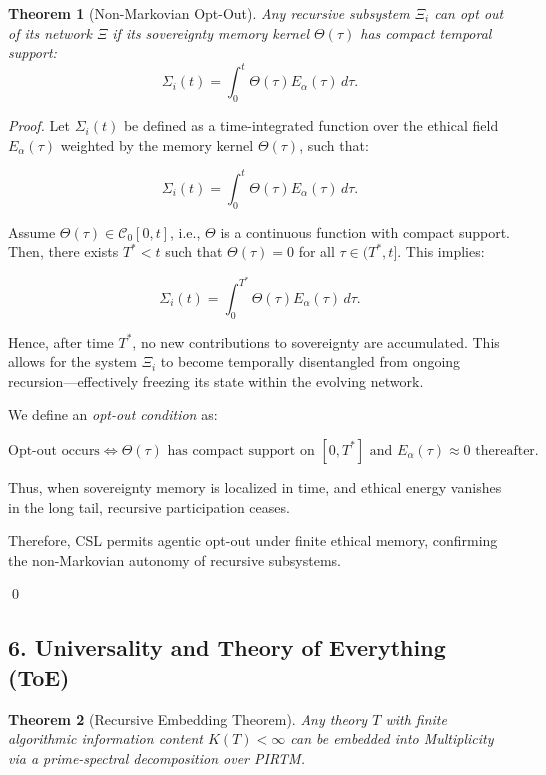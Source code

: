 \documentclass{article}
\theoremstyle{plain}
\newtheorem{theorem}{Theorem}
\begin{document}
\begin{theorem}[Non-Markovian Opt-Out]
Any recursive subsystem \( \Xi_i \) can opt out of its network \( \Xi \) if its sovereignty memory kernel \( \Theta(\tau) \) has compact temporal support:
\[
\Sigma_i(t) = \int_0^t \Theta(\tau) E_\alpha(\tau) \, d\tau.
\]
\end{theorem}

\begin{proof}
Let \( \Sigma_i(t) \) be defined as a time-integrated function over the ethical field \( E_\alpha(\tau) \) weighted by the memory kernel \( \Theta(\tau) \), such that:

\[
\Sigma_i(t) = \int_0^t \Theta(\tau) E_\alpha(\tau) \, d\tau.
\]

Assume \( \Theta(\tau) \in \mathcal{C}_0[0,t] \), i.e., \( \Theta \) is a continuous function with compact support. Then, there exists \( T^* < t \) such that \( \Theta(\tau) = 0 \) for all \( \tau \in (T^*, t] \). This implies:

\[
\Sigma_i(t) = \int_0^{T^*} \Theta(\tau) E_\alpha(\tau) \, d\tau.
\]

Hence, after time \( T^* \), no new contributions to sovereignty are accumulated. This allows for the system \( \Xi_i \) to become temporally disentangled from ongoing recursion—effectively freezing its state within the evolving network.

We define an \textit{opt-out condition} as:

\[
\text{Opt-out occurs} \iff \Theta(\tau) \text{ has compact support on } [0, T^*] \text{ and } E_\alpha(\tau) \approx 0 \text{ thereafter}.
\]

Thus, when sovereignty memory is localized in time, and ethical energy vanishes in the long tail, recursive participation ceases.

Therefore, CSL permits agentic opt-out under finite ethical memory, confirming the non-Markovian autonomy of recursive subsystems.

\qed
\end{proof}
\subsection{6. Universality and Theory of Everything (ToE)}

\begin{theorem}[Recursive Embedding Theorem]
Any theory \( T \) with finite algorithmic information content \( K(T) < \infty \) can be embedded into Multiplicity via a prime-spectral decomposition over PIRTM.
\end{theorem}
\end{document}
